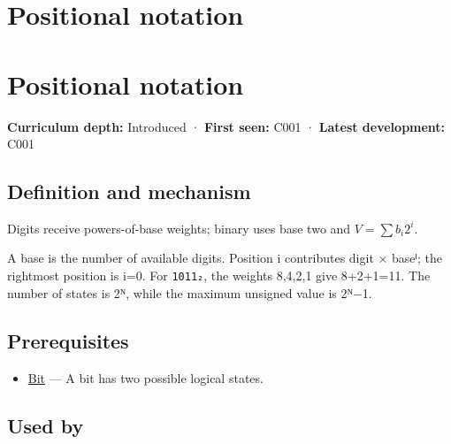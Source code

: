 \hypertarget{appendix-83c3f28f7bda}{}
\section*{Positional notation}
\section{Positional notation}\label{positional-notation}

\textbf{Curriculum depth:} Introduced · \textbf{First seen:} C001 · \textbf{Latest development:} C001

\subsection{Definition and mechanism}\label{definition-and-mechanism}

Digits receive powers-of-base weights; binary uses base two and \(V=\sum b_i2^i\).

A base is the number of available digits. Position i contributes digit × baseⁱ; the rightmost position is i=0. For \texttt{1011₂}, the weights 8,4,2,1 give 8+2+1=11. The number of states is 2ᴺ, while the maximum unsigned value is 2ᴺ−1.

\subsection{Prerequisites}\label{prerequisites}

\begin{itemize}
\tightlist
\item
  \hyperref[appendix-ddbb69998a2e]{Bit} --- A bit has two possible logical states.
\end{itemize}

\subsection{Used by}\label{used-by}

